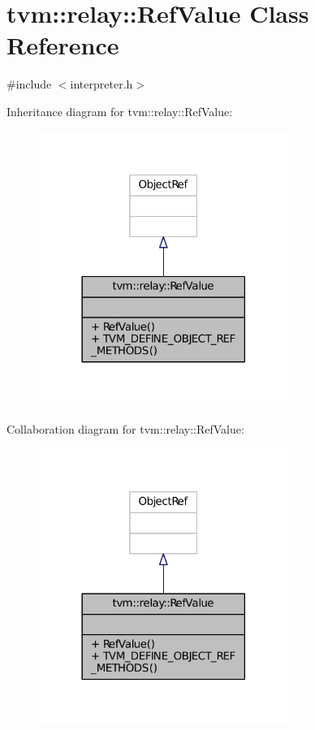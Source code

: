 \hypertarget{classtvm_1_1relay_1_1RefValue}{}\section{tvm\+:\+:relay\+:\+:Ref\+Value Class Reference}
\label{classtvm_1_1relay_1_1RefValue}


{\ttfamily \#include $<$interpreter.\+h$>$}



Inheritance diagram for tvm\+:\+:relay\+:\+:Ref\+Value\+:
\nopagebreak
\begin{figure}[H]
\begin{center}
\leavevmode
\includegraphics[width=230pt]{classtvm_1_1relay_1_1RefValue__inherit__graph}
\end{center}
\end{figure}


Collaboration diagram for tvm\+:\+:relay\+:\+:Ref\+Value\+:
\nopagebreak
\begin{figure}[H]
\begin{center}
\leavevmode
\includegraphics[width=230pt]{classtvm_1_1relay_1_1RefValue__coll__graph}
\end{center}
\end{figure}

